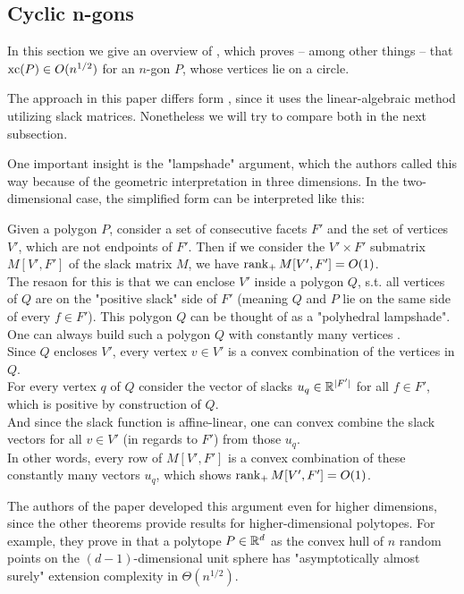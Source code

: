 \subsection{Cyclic n-gons}

In this section we give an overview of \cite{kwan2020extension}, which proves -- among other things -- that $\operatorname{xc}(P) \in O(n^{1/2})$ for an $n$-gon $P$, whose vertices lie on a circle.

The approach in this paper differs form \cite{shitov2020sublinear}, since it uses the linear-algebraic method utilizing slack matrices. Nonetheless we will try to compare both in the next subsection.

One important insight is the "lampshade" argument, which the authors called this way because of the geometric interpretation in three dimensions. In the two-dimensional case, the simplified form can be interpreted like this:

Given a polygon $P$, consider a set of consecutive facets $F'$ and the set of vertices $V'$, which are not endpoints of $F'$. Then if we consider the $V' \times F'$ submatrix $M[V',F']$ of the slack matrix $M$, we have $\operatorname{rank}_+ M[V',F'] = O(1)$.\\
The resaon for this is that we can enclose $V'$ inside a polygon $Q$, s.t. all vertices of $Q$ are on the "positive slack" side of $F'$ (meaning $Q$ and $P$ lie on the same side of every $f \in F'$). This polygon $Q$ can be thought of as a "polyhedral lampshade". One can always build such a polygon $Q$ with constantly many vertices .\\
Since $Q$ encloses $V'$, every vertex $v \in V'$ is a convex combination of the vertices in $Q$.\\
For every vertex $q$ of $Q$ consider the vector of slacks $u_q \in \mathbb{R}^{\lvert F'\rvert}$ for all $f \in F'$, which is positive by construction of $Q$.\\
And since the slack function is affine-linear, one can convex combine the slack vectors for all $v \in V'$ (in regards to $F'$) from those $u_q$.\\
In other words, every row of $M[V',F']$ is a convex combination of these constantly many vectors $u_q$, which shows $\operatorname{rank}_+ M[V',F'] = O(1)$.

The authors of the paper developed this argument even for higher dimensions, since the other theorems provide results for higher-dimensional polytopes. For example, they prove in \cite[Theorem 1.1]{shitov2020sublinear} that a polytope $P \in \mathbb{R}^d$ as the convex hull of $n$ random points on the $(d-1)$-dimensional unit sphere has "asymptotically almost surely" extension complexity in $\Theta(n^{1/2})$.

